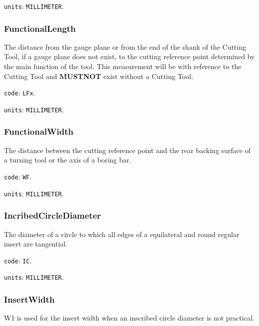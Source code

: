 \texttt{units}: \texttt{MILLIMETER}.



\subsubsection{FunctionalLength}




The distance from the gauge plane or from the end of the shank of the Cutting Tool, if a gauge plane does not exist, to the cutting reference point determined by the main function of the tool. This measurement will be with reference to the Cutting Tool and \textbf{MUSTNOT} exist without a Cutting Tool.


\texttt{code}: \texttt{LFx}.


\texttt{units}: \texttt{MILLIMETER}.



\subsubsection{FunctionalWidth}
\label{sec:FunctionalWidth}



The distance between the cutting reference point and the rear backing surface of a turning tool or the axis of a boring bar.


\texttt{code}: \texttt{WF}.


\texttt{units}: \texttt{MILLIMETER}.



\subsubsection{IncribedCircleDiameter}
\label{sec:IncribedCircleDiameter}



The diameter of a circle to which all edges of a equilateral and round regular insert are tangential.


\texttt{code}: \texttt{IC}.


\texttt{units}: \texttt{MILLIMETER}.



\subsubsection{InsertWidth}
\label{sec:InsertWidth}



W1 is used for the insert width when an inscribed circle diameter is not practical.


